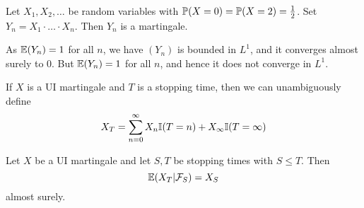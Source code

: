 \begin{exmp}
  \label{defn:discrete_time_martingales:15}
  Let $X_{1}, X_{2}, \dots$ be \iid random variables with $\Prob{X =
    0} = \Prob{X = 2} = \frac{1}{2}$.   Set $Y_{n}= X_{1}\cdot \dots
  \cdot X_{n}$.  Then $Y_{n}$ is a martingale.

  As $\E{Y_{n}} = 1$ for all $n$, we have $(Y_{n})$ is bounded in
  $L^{1}$, and it converges almost surely to 0.  But $\E{Y_{n}} = 1$
  for all $n$, and hence it does not converge in $L^{1}$.
\end{exmp}

If $X$ is a UI martingale and $T$ is a stopping time, then we can
unambiguously define
\begin{equation}
  \label{eq:44}
  X_{T} = \sum_{n=0}^{\infty} X_{n} \I{T = n} + X_{\infty} \I{T = \infty}
\end{equation}


\begin{thm}
  \label{defn:discrete_time_martingales:16}
  Let $X$ be a UI martingale and let $S, T$ be stopping times with $S
  \leq T$.  Then
  \begin{equation}
    \label{eq:45}
    \E{X_{T} | \mathcal{F}_{S}} = X_{S}    
  \end{equation} almost surely.
\end{thm}

